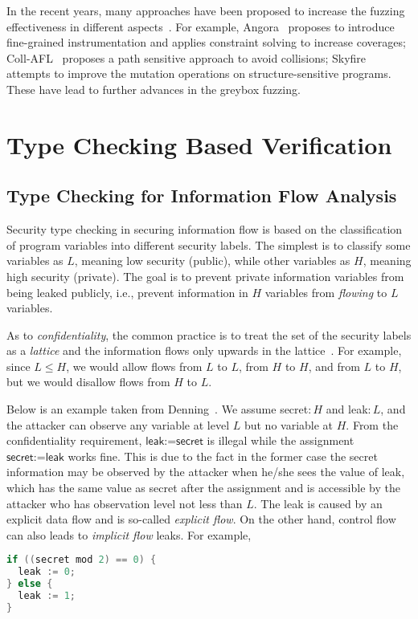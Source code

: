In the recent years, many approaches have been proposed to increase the fuzzing effectiveness in different aspects~\cite{Bohme:2016:CGF,LiCMLLT17,Bohme:2017:DGF,FairFuzz,CollAFL,Angora,nezha,fuzz_survey,issta19:deephunter,fse19:deepstellar}. For example, Angora~\cite{Angora} proposes to introduce fine-grained instrumentation and applies constraint solving to increase coverages; Coll-AFL~\cite{CollAFL} proposes a path sensitive approach to avoid collisions; Skyfire~\cite{junjie:2017sp:skyfire} attempts to improve the mutation operations on structure-sensitive programs. These have lead to further advances in the greybox fuzzing.

\section{Type Checking Based Verification}\label{sec:intro-sta}

\subsection{Type Checking for Information Flow Analysis}

Security type checking in securing information flow is based on the classification of program variables into different security labels. The simplest is to classify some variables as $L$, meaning low security (public), while other variables as $H$, meaning high security (private). The goal is to prevent private information variables from being leaked publicly, i.e., prevent information in $H$ variables from \emph{flowing} to $L$ variables.

As to \emph{confidentiality}, the common practice is to treat the set of the security labels as a  \emph{lattice} and the information flows only upwards in the lattice~\cite{Denning:1977hwa}. For example, since $L\leq H$, we would allow flows from $L$ to $L$, from $H$ to $H$, and from $L$ to $H$, but we would disallow flows from $H$ to $L$.

Below is an example taken from Denning~\cite{Denning:1976cl}. We assume \textsf{secret}$:H$ and \textsf{leak}$:L$, and the attacker can observe any variable at level $L$ but no variable at $H$.
From the confidentiality requirement, $\textsf{leak:=secret}$ is illegal while the assignment $\textsf{secret:=leak}$ works fine. This is due to the fact in the former case the secret information may be observed by the attacker when he/she sees the value of \textsf{leak}, which has the same value as \textsf{secret} after the assignment and is accessible by the attacker who has observation level not less than $L$. The leak is caused by an explicit data flow and is so-called \emph{explicit flow}. On the other hand, control flow can also leads to \emph{implicit flow} leaks. For example,
\begin{lstlisting}[language=c]
if ((secret mod 2) == 0) {
  leak := 0;
} else {
  leak := 1;	
}  
\end{lstlisting}

